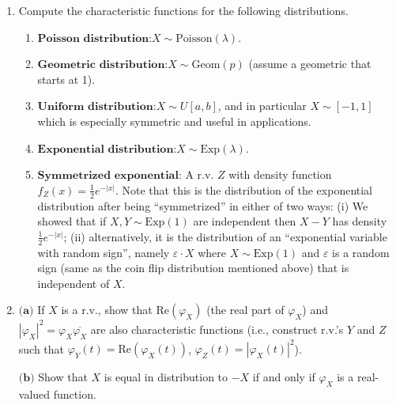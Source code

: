 \begin{enumerate}[label=\arabic*.]
(c) For each $n\ge 1$, find the density function of
the coordinate $X_{n,1}$. Optionally, use this to
give an alternative solution to part (b) above.

$\textbf{Hint.}$ Do it first for $n=2$ and $n=3$, and
generalize using ideas from multivariate calculus. For
$n=3$, you should find that $X_{3,1} \sim U[-1,1]$, a
geometric fact which was known to Archimedes.

\item Compute the characteristic functions for the
following distributions.

\begin{enumerate}[label=(\alph*)]
\item $\textbf{Poisson distribution:}$$X\sim \textrm{Poisson}(\lambda)$.

\item $\textbf{Geometric distribution:}$$X\sim \textrm{Geom}(p)$ (assume a geometric that
starts at 1).

\item $\textbf{Uniform distribution:}$$X \sim U[a,b]$, and
in particular $X\sim [-1,1]$ which is especially
symmetric and useful in applications.

\item $\textbf{Exponential distribution:}$$X\sim \textrm{Exp}(\lambda)$.

\item $\textbf{Symmetrized exponential:}$ A r.v. $Z$ with
density function $f_Z(x) = \frac12 e^{-|x|}$. Note
that this is the distribution of the exponential
distribution after being ``symmetrized'' in either of
two ways: (i) We showed that if
$X,Y\sim \textrm{Exp}(1)$ are independent then $X-Y$
has density $\frac12 e^{-|x|}$; (ii) alternatively,
it is the distribution of an ``exponential variable
with random sign'', namely $\varepsilon\cdot X$ where
$X\sim \textrm{Exp}(1)$ and $\varepsilon$ is a random
sign (same as the coin flip distribution mentioned
above) that is independent of $X$.
\end{enumerate}

\item $\textbf{(a)}$ If $X$ is a r.v., show that
$\textrm{Re}(\varphi_X)$ (the real part of
$\varphi_X$) and
$|\varphi_X|^2 = \varphi_X \overline{\varphi_X}$ are
also characteristic functions (i.e., construct r.v.'s
$Y$ and $Z$ such that
$\varphi_Y(t) = \textrm{Re}(\varphi_X(t))$,
$\varphi_Z(t) = |\varphi_X(t)|^2$).

$\textbf{(b)}$ Show that $X$ is equal in distribution
to $-X$ if and only if $\varphi_X$ is a real-valued
function.


\end{enumerate}
